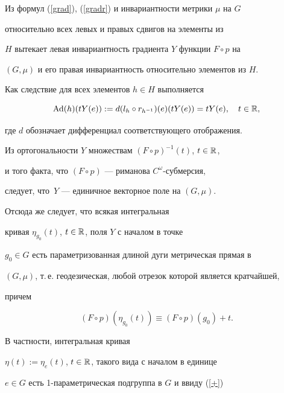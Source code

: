 \begin{pf}
Из формул (\ref{grad}), (\ref{gradr}) и инвариантности метрики $\mu$ на $G$


относительно всех левых и правых сдвигов на элементы из


$H$ вытекает левая инвариантность градиента $Y$ функции $F\circ{p}$ на


$(G,\mu)$ и его правая инвариантность относительно элементов из $H$.


Как следствие для всех элементов $h\in H$ выполняется


\begin{equation}


\label{Ad}


\Ad(h)(tY(e)):= d(l_{h}\circ{r_{h^{-1}}})(e)(tY(e))=tY(e),\quad t\in \Bbb{R},


\end{equation}


где $d$ обозначает дифференциал соответствующего отображения.


Из ортогональности $Y$ множествам $(F\circ{p})^{-1}(t)$, $t\in \Bbb{R}$,


и того факта, что $(F\circ{p})$ --- риманова $C^{\omega}$-субмерсия,


следует, что~$Y$ --- единичное векторное поле на $(G,\mu)$.


Отсюда же следует, что всякая интегральная


кривая $\eta_{g_{0}}(t)$, $t \in \Bbb{R}$, поля $Y$ с началом в точке


$g_{0}\in G$ есть параметризованная длиной дуги метрическая прямая в


$(G,\mu)$, т.\,е. геодезическая, любой отрезок которой является кратчайшей,


причем


\begin{equation}


\label{+}


(F\circ{p})(\eta_{g_{0}}(t))\equiv (F\circ{p})(g_{0})+t.


\end{equation}


В частности, интегральная кривая


$\eta(t):=\eta_{e}(t)$, $t\in \Bbb{R}$, такого вида с началом в единице


$e\in G$ есть 1-параметрическая подгруппа в $G$ и ввиду (\ref{+})


\begin{equation}


\label{eta}



\end{equation}
\end{pf}
